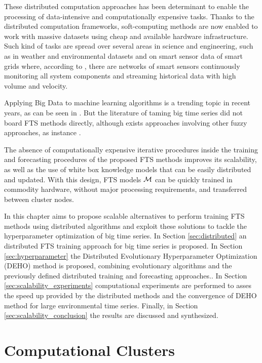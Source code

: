 These distributed computation approaches has been determinant to enable the processing of data-intensive and computationally expensive tasks. Thanks to the distributed computation frameworks, soft-computing methods are now enabled to work with massive datasets using cheap and available hardware infrastructure. Such kind of tasks are spread over several areas in science and engineering, such as in weather and environmental datasets and on smart sensor data of smart grids where, according to \cite{Coelho2016}, there are networks of smart sensors continuously monitoring all system components and streaming historical data with high volume and velocity. 

Applying Big Data to machine learning algorithms is a trending topic in recent years, as can be seen in \cite{Zhou2017}. But the literature of taming big time series did not board FTS methods directly, although exists approaches involving other fuzzy approaches, as instance \cite{Singh2015}.

The absence of computationally expensive iterative procedures inside the training and forecasting procedures of the proposed FTS methods improves its scalability, as well as the use of white box knowledge models that can be easily distributed and updated. With this design, FTS models $\mathcal{M}$ can be quickly trained in commodity hardware, without major processing requirements, and transferred between cluster nodes. 

In this chapter aims to propose scalable alternatives to perform  training FTS methods using distributed algorithms and exploit  these solutions to tackle the hyperparameter optimization of big time series. In Section \ref{sec:distributed} an distributed FTS training approach for big time series is proposed. In Section \ref{sec:hyperparameter} the Distributed Evolutionary Hyperparameter Optimization (DEHO) method is proposed, combining evolutionary algorithms and the previously defined distributed training and forecasting approaches.. In Section \ref{sec:scalability_experiments} computational experiments are performed to asses the speed up provided by the distributed methods and the convergence of DEHO method for large environmental time series. Finally, in Section \ref{sec:scalability_conclusion} the results are discussed and synthesized.

\section{Computational Clusters}

